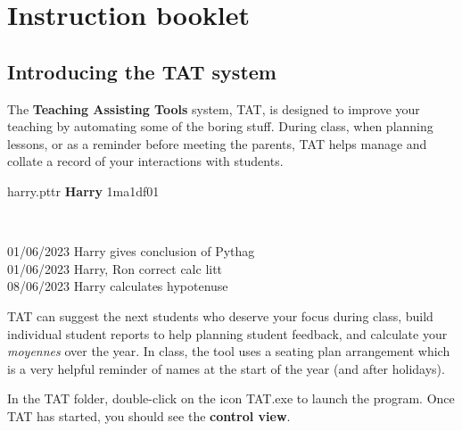 \documentclass[10pt]{article}
\begin{document}
\newpage
\section{Instruction booklet} \label{instructions}

\subsection{Introducing the TAT system}
The \textbf{Teaching Assisting Tools} system, TAT, is designed to improve your teaching by automating some of the boring stuff. During class, when planning lessons, or as a reminder before meeting the parents, TAT helps manage and collate a record of your interactions with students.

\begin{center}
\begin{tcolorbox}

harry.pttr \hfill \textbf{Harry} \hfill 1ma1df01

\

\small{
01/06/2023 Harry gives conclusion of Pythag \\
01/06/2023 Harry, Ron correct calc litt \\
08/06/2023 Harry calculates hypotenuse
}

\vspace{10mm}

\begin{center}
\end{center}

\end{tcolorbox}
\end{center}

TAT can suggest the next students who deserve your focus during class, build individual student reports to help planning student feedback, and calculate your \emph{moyennes} over the year. In class, the tool uses a seating plan arrangement which is a very helpful reminder of names at the start of the year (and after holidays).

In the TAT folder, double-click on the icon TAT.exe to launch the program. Once TAT has started, you should see the \textbf{control view}.
\end{document}
